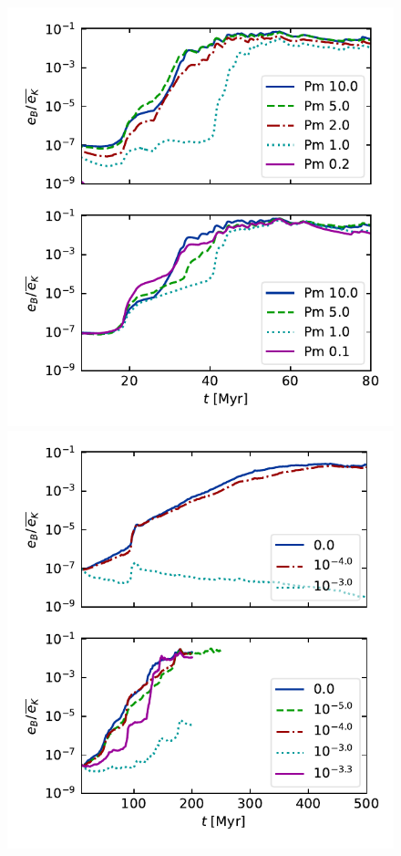\documentclass[preprint2]{aastex63}
\begin{document}
{\begin{figure}
  \includegraphics[trim=0.5cm 0.0cm 0.3cm 0.0cm, clip=true,width=\columnwidth]{figs/1pc-eB-nu5.pdf}\\
  \includegraphics[trim=0.5cm 0.0cm 0.3cm 0.0cm, clip=true,width=\columnwidth]{figs/2pc-eB-nu5.pdf}

\end{figure}}
\end{document}
